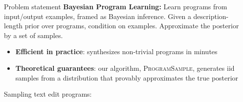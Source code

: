 \documentclass[final]{beamer}
\newlength{\sepwid}
\newlength{\onecolwid}
\newcommand{\theSystem}{\textsc{ProgramSample}}
\begin{document}
\begin{frame}[t] %

\begin{columns}[t] %

\begin{column}{\sepwid}\end{column} %

\begin{column}{\onecolwid} %


\begin{alertblock}{Problem statement}
  \textbf{Bayesian Program Learning:} Learn programs from input/output examples, framed as Bayesian inference.
  Given a description-length prior over programs, condition on examples. 
  Approximate the posterior by a set of samples.

  \begin{itemize}
  \item \textbf{Efficient in practice}: synthesizes non-trivial programs in minutes
  \item \textbf{Theoretical guarantees}: our algorithm, \theSystem , generates iid samples from a distribution that provably approximates the true posterior 
    \end{itemize}

Sampling text edit programs:
  
\centering{}
\end{alertblock}


\end{column}
\end{columns}
\end{frame}
\end{document}
